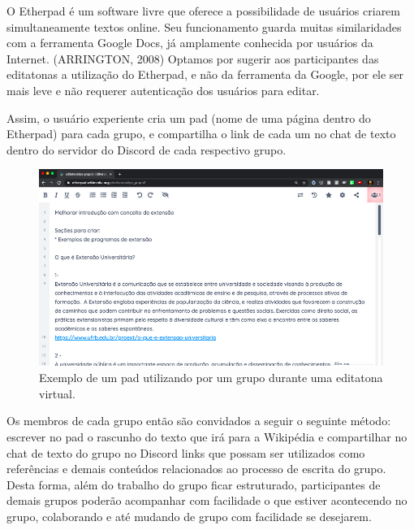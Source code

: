O Etherpad é um software livre que oferece a possibilidade de usuários criarem simultaneamente textos online. Seu funcionamento guarda muitas similaridades com a ferramenta Google Docs, já amplamente conhecida por usuários da Internet. (ARRINGTON, 2008) Optamos por sugerir aos participantes das editatonas a utilização do Etherpad, e não da ferramenta da Google, por ele ser mais leve e não requerer autenticação dos usuários para editar.

Assim, o usuário experiente cria um pad (nome de uma página dentro do Etherpad) para cada grupo, e compartilha o link de cada um no chat de texto dentro do servidor do Discord de cada respectivo grupo.

\begin{figure}[H]
    \centering
    \includegraphics[width=1\textwidth]{Images/etherpad.png}
    \caption{Exemplo de um pad utilizando por um grupo durante uma editatona virtual.}
    \label{fig:etherpad}
\end{figure}

Os membros de cada grupo então são convidados a seguir o seguinte método: escrever no pad o rascunho do texto que irá para a Wikipédia e compartilhar no chat de texto do grupo no Discord links que possam ser utilizados como referências e demais conteúdos relacionados ao processo de escrita do grupo. Desta forma, além do trabalho do grupo ficar estruturado, participantes de demais grupos poderão acompanhar com facilidade o que estiver acontecendo no grupo, colaborando e até mudando de grupo com facilidade se desejarem.


